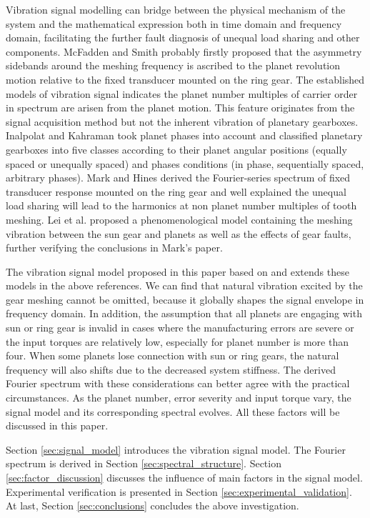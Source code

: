 \documentclass[a4paper,fleqn]{cas-sc}%
\begin{document}
\par Vibration signal modelling can bridge between the physical mechanism of the system and the mathematical expression both in time domain and frequency domain, facilitating the further fault diagnosis of unequal load sharing and other components. McFadden and Smith \cite{McFadden1985} probably firstly proposed that the asymmetry sidebands around the meshing frequency is ascribed to the planet revolution motion relative to the fixed transducer mounted on the ring gear. The established models of vibration signal indicates the planet number multiples of carrier order in spectrum are arisen from the planet motion. This feature originates from the signal acquisition method but not the inherent vibration of planetary gearboxes. Inalpolat and Kahraman \cite{Inalpolat2009} took planet phases into account and classified planetary gearboxes into five classes according to their planet angular positions (equally spaced or unequally spaced) and phases conditions (in phase, sequentially spaced, arbitrary phases). Mark and Hines \cite{Mark2009} derived the Fourier-series spectrum of fixed transducer response mounted on the ring gear and well explained the unequal load sharing will lead to the harmonics at non planet number multiples of tooth meshing. Lei \cite{Lei2016} et al. proposed a phenomenological model containing the meshing vibration between the sun gear and planets as well as the effects of gear faults, further verifying the conclusions in Mark's paper.
\par The vibration signal model proposed in this paper based on and extends these models in the above references. We  can find that natural vibration excited by the gear meshing cannot be omitted, because it globally shapes the signal envelope in frequency domain. In addition, the assumption that all planets are engaging with sun or ring gear is invalid in cases where the manufacturing errors are severe or the input torques are relatively low, especially for planet number is more than four. When some planets lose connection with sun or ring gears, the natural frequency will also shifts due to the decreased system stiffness. The derived Fourier spectrum with these considerations can better agree with the practical circumstances. As the planet number, error severity and input torque vary, the signal model and its corresponding spectral evolves. All these factors will be discussed in this paper.
\par Section \ref{sec:signal_model} introduces the vibration signal model. The Fourier spectrum is derived in Section \ref{sec:spectral_structure}. Section \ref{sec:factor_discussion} discusses the influence of main factors in the signal model. Experimental verification is presented in Section \ref{sec:experimental_validation}. At last, Section \ref{sec:conclusions} concludes the above investigation. 
\end{document}
